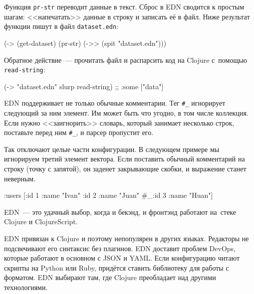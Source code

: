 Функция \verb|pr-str| переводит данные в текст. Сброс в EDN сводится к простым
шагам: <<напечатать>> данные в строку и записать её в файл. Ниже результат
функции пишут в файл \verb|dataset.edn|:

\begin{english}
  \begin{clojure}
(-> (get-dataset)
    (pr-str)
    (->> (spit "dataset.edn")))
  \end{clojure}
\end{english}

Обратное действие~--- прочитать файл и распарсить код на Clojure с~помощью
\verb|read-string|:

\begin{english}
  \begin{clojure}
(-> "dataset.edn" slurp read-string)
;; {:some ["data"]}
  \end{clojure}
\end{english}


EDN поддерживает не только обычные комментарии. Тег \verb|#_| игнорирует
следующий за ним элемент. Им может быть что угодно, в том числе коллекция. Если
нужно <<заигнорить>> словарь, который занимает несколько строк, поставьте перед
ним \verb|#_|, и парсер пропустит его.


Так отключают целые части конфигурации. В следующем примере мы игнорируем третий
элемент вектора. Если поставить обычный комментарий на строку (точку с запятой),
он заденет закрывающие скобки, и выражение станет неверным.

\begin{english}
  \begin{clojure}
{:users [{:id 1 :name "Ivan"}
         {:id 2 :name "Juan"}
         #_{:id 3 :name "Huan"}]}
  \end{clojure}
\end{english}

EDN~--- это удачный выбор, когда и бекэнд, и фронтэнд работают на~стеке Clojure и
ClojureScript.

EDN привязан к Clojure и поэтому непопулярен в других языках. Редакторы не
подсвечивают его синтаксис без плагинов. EDN доставит проблем DevOps, которые
работают в основном с JSON и YAML. Если конфигурацию читают скрипты на Python
или Ruby, придётся ставить библиотеку для работы с форматом. EDN выбирают там,
где Clojure преобладает над другими технологиями.

